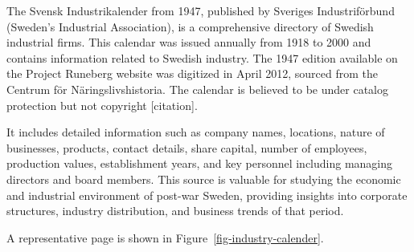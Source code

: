 \documentclass[
]{article}
\begin{document}
The Svensk Industrikalender from 1947, published by Sveriges
Industriförbund (Sweden's Industrial Association), is a comprehensive
directory of Swedish industrial firms. This calendar was issued annually
from 1918 to 2000 and contains information related to Swedish industry.
The 1947 edition available on the Project Runeberg website was digitized
in April 2012, sourced from the Centrum för Näringslivshistoria. The
calendar is believed to be under catalog protection but not copyright
{[}citation{]}.

It includes detailed information such as company names, locations,
nature of businesses, products, contact details, share capital, number
of employees, production values, establishment years, and key personnel
including managing directors and board members. This source is valuable
for studying the economic and industrial environment of post-war Sweden,
providing insights into corporate structures, industry distribution, and
business trends of that period.

A representative page is shown in Figure~\ref{fig-industry-calender}.
\end{document}
